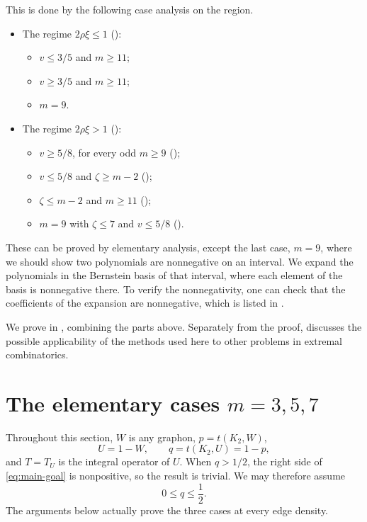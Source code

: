 \documentclass[11pt]{article}
\numberwithin{equation}{section}
\begin{document}
\begin{enumerate}[label=\textbf{Section \arabic*.},leftmargin=4.6em,start=2]
  This is done by the following case analysis on the region.
  \begin{itemize}[leftmargin=1.6em,topsep=2pt,itemsep=1pt]
    \item The regime $2\rho\xi\le1$ ():
    \begin{itemize}[leftmargin=1.4em,topsep=1pt,itemsep=0pt]
      \item $v\le3/5$ and $m\ge11$;
      \item $v\ge3/5$ and $m\ge11$;
      \item $m=9$.
    \end{itemize}
    \item The regime $2\rho\xi>1$ ():
    \begin{itemize}[leftmargin=1.4em,topsep=1pt,itemsep=0pt]
      \item $v\ge5/8$, for every odd $m\ge9$
      ();
      \item $v\le5/8$ and $\zeta\ge m-2$
      ();
      \item $\zeta\le m-2$ and $m\ge11$
      ();
      \item $m=9$ with $\zeta\le7$ and $v\le5/8$
      ().
    \end{itemize}
  \end{itemize}
  These can be proved by elementary analysis, except the last case, $m=9$, where we should show two polynomials are nonnegative on an interval.
  We expand the polynomials in the Bernstein basis of that interval, where each element of the basis is nonnegative there.
  To verify the nonnegativity, one can check that the coefficients of the expansion are nonnegative, which is listed in .
\end{enumerate}

We prove  in , combining the parts above.
Separately from the proof,  discusses the possible
applicability of the methods used here to other problems in extremal
combinatorics.

\section{The elementary cases \texorpdfstring{$m=3,5,7$}{m=3,5,7}}\label{sec:short-cycles}

Throughout this section, $W$ is any graphon, $p=t(K_2,W)$,
\[
  U=1-W,\qquad q=t(K_2,U)=1-p,
\]
and $T=T_U$ is the integral operator of $U$.  When $q>1/2$, the
right side of \eqref{eq:main-goal} is nonpositive, so the result is trivial.
We may therefore assume
\begin{equation}\label{eq:q-short}
  0\le q\le\frac{1}{2}.
\end{equation}
The arguments below actually prove the three cases at every edge density.
\end{document}
